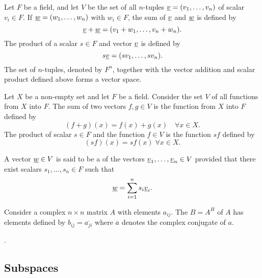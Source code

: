 \begin{example}
Let $F$ be a field, and let $V$ be the set of all $n$-tuples $\underline{v} = (v_1, \ldots, v_n)$ of scalar $v_i \in F$.
If $\underline{w} = (w_1, \ldots, w_n)$ with $w_i \in F$, the sum of $\underline{v}$ and $\underline{w}$ is defined by
\begin{equation*}
\underline{v} + \underline{w} = (v_1 + w_1, \ldots, v_n + w_n).
\end{equation*}
The product of a scalar $s \in F$ and vector $\underline{v}$ is defined by
\begin{equation*}
s \underline{v} = (s v_1, \ldots, s v_n).
\end{equation*}
The set of $n$-tuples, denoted by $F^n$, together with the vector addition and scalar product defined above forms a vector space.
\end{example}

\begin{example}
Let $X$ be a non-empty set and let $F$ be a field.
Consider the set $V$ of all functions from $X$ into $F$.
The sum of two vectors $f,g \in V$ is the function from $X$ into $F$ defined by
\begin{equation*}
(f + g)(x) = f(x) + g(x) \quad \forall x \in X.
\end{equation*}
The product of scalar $s \in F$ and the function $f \in V$ is the function $sf$ defined by
\begin{equation*}
(sf)(x) = s f(x) \; \forall x \in X.
\end{equation*}
\end{example}

\begin{definition}
A vector $\underline{w} \in V$ is said to be a  of the vectors $\underline{v}_1, \ldots, \underline{v}_n \in V$ provided that there exist scalars $s_1, \ldots, s_n \in F$ such that
\begin{equation*}
\underline{w} = \sum_{i=1}^n s_i \underline{v}_i.
\end{equation*}
\end{definition}

\begin{definition}
Consider a complex $n \times n$ matrix $A$ with elements $a_{ij}$.
The  $B = A^H$ of $A$ has elements defined by $b_{ij} = \overline{a_{ji}}$ where $\overline{a}$ denotes the complex conjugate of $a$.
\end{definition}.

\subsection{Subspaces}

